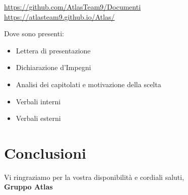 \documentclass[a4paper,12pt]{article}
\begin{document}
\begin{center}
    \url{https://github.com/AtlasTeam9/Documenti} \\
    \url{https://atlasteam9.github.io/Atlas/}
\end{center}

Dove sono presenti:
\begin{itemize}
    \item Lettera di presentazione
    \item Dichiarazione d'Impegni
    \item Analisi dei capitolati e motivazione della scelta
    \item Verbali interni
    \item Verbali esterni
\end{itemize}

\section*{Conclusioni}
Vi ringraziamo per la vostra disponibilità e cordiali saluti, \\
\textbf{Gruppo Atlas}
\end{document}
